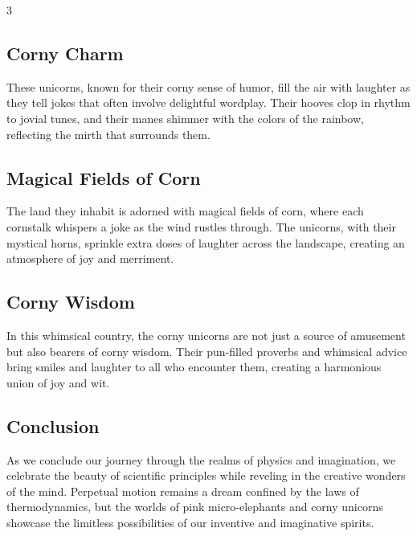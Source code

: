 \documentclass[
  t,%
]{_style/tudelft-beamerposter}
\begin{document}
\begin{frame}[fragile]
\begin{multicols}{3}
    \subsection{Corny Charm}
    These unicorns, known for their corny sense of humor, fill the air with laughter as they tell jokes that often involve delightful wordplay. Their hooves clop in rhythm to jovial tunes, and their manes shimmer with the colors of the rainbow, reflecting the mirth that surrounds them.

    \subsection{Magical Fields of Corn}
    The land they inhabit is adorned with magical fields of corn, where each cornstalk whispers a joke as the wind rustles through. The unicorns, with their mystical horns, sprinkle extra doses of laughter across the landscape, creating an atmosphere of joy and merriment.

    \subsection{Corny Wisdom}
    In this whimsical country, the corny unicorns are not just a source of amusement but also bearers of corny wisdom. Their pun-filled proverbs and whimsical advice bring smiles and laughter to all who encounter them, creating a harmonious union of joy and wit.

    \subsection{Conclusion}
    As we conclude our journey through the realms of physics and imagination, we celebrate the beauty of scientific principles while reveling in the creative wonders of the mind. Perpetual motion remains a dream confined by the laws of thermodynamics, but the worlds of pink micro-elephants and corny unicorns showcase the limitless possibilities of our inventive and imaginative spirits.
  \end{multicols}
\end{frame}


\usebackgroundtemplate{\rlap{\textcolor{bg}{\rule{\paperwidth}{\paperheight}}}%
  \textcolor{fg}{\smash{\hspace{-0.65\paperwidth}\raisebox{-0.2\paperheight}{%
    \tudflame[scale=\numexpr\paperheight/800000]}}}}%
\end{document}
